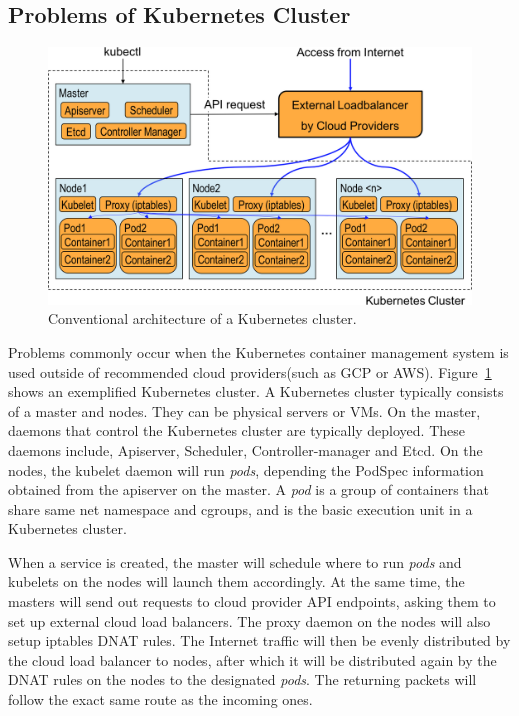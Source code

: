 \subsection{Problems of Kubernetes Cluster}

\begin{figure}
\includegraphics[width=\columnwidth]{Figs/K8sConventional}
\caption

{Conventional architecture of a Kubernetes cluster.}
\label{fig:K8sConventional}
\end{figure}

Problems commonly occur when the Kubernetes container management system is used outside of recommended cloud providers(such as GCP or AWS).
Figure~\ref{fig:K8sConventional} shows an exemplified Kubernetes cluster.
A Kubernetes cluster typically consists of a master and nodes. They can be physical servers or VMs.
On the master, daemons that control the Kubernetes cluster are typically deployed. 
These daemons include, Apiserver, Scheduler, Controller-manager and Etcd. 
On the nodes, the kubelet daemon will run {\it pods}, depending the PodSpec information obtained from the apiserver on the master.
A {\em pod} is a group of containers that share same net namespace and cgroups, 
and is the basic execution unit in a Kubernetes cluster.

When a service is created, the master will schedule where to run {\em pods} and kubelets on the nodes will launch them accordingly.
At the same time, the masters will send out requests to cloud provider API endpoints, asking them to set up external cloud load balancers.
The proxy daemon on the nodes will also setup iptables DNAT\cite{MartinA.Brown2017} rules. 
The Internet traffic will then be evenly distributed by the cloud load balancer to nodes, 
after which it will be distributed again by the DNAT rules on the nodes to the designated {\em pods}. 
The returning packets will follow the exact same route as the incoming ones.

